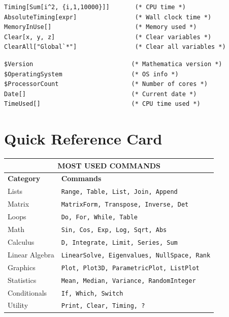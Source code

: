 \documentclass[12pt,a4paper]{article}
\begin{document}
\begin{commandbox}
\begin{lstlisting}
Timing[Sum[i^2, {i,1,10000}]]       (* CPU time *)
AbsoluteTiming[expr]                (* Wall clock time *)
MemoryInUse[]                       (* Memory used *)
Clear[x, y, z]                      (* Clear variables *)
ClearAll["Global`*"]                (* Clear all variables *)
\end{lstlisting}
\end{commandbox}

\begin{commandbox}
\begin{lstlisting}
$Version                           (* Mathematica version *)
$OperatingSystem                   (* OS info *)
$ProcessorCount                    (* Number of cores *)
Date[]                             (* Current date *)
TimeUsed[]                         (* CPU time used *)
\end{lstlisting}
\end{commandbox}

\section{Quick Reference Card}

\begin{center}
\begin{tabular}{|l|l|}
\hline
\multicolumn{2}{|c|}{\textbf{\color{primary} MOST USED COMMANDS}} \\
\hline
\textbf{Category} & \textbf{Commands} \\
\hline
Lists & \texttt{Range, Table, List, Join, Append} \\
Matrix & \texttt{MatrixForm, Transpose, Inverse, Det} \\
Loops & \texttt{Do, For, While, Table} \\
Math & \texttt{Sin, Cos, Exp, Log, Sqrt, Abs} \\
Calculus & \texttt{D, Integrate, Limit, Series, Sum} \\
Linear Algebra & \texttt{LinearSolve, Eigenvalues, NullSpace, Rank} \\
Graphics & \texttt{Plot, Plot3D, ParametricPlot, ListPlot} \\
Statistics & \texttt{Mean, Median, Variance, RandomInteger} \\
Conditionals & \texttt{If, Which, Switch} \\
Utility & \texttt{Print, Clear, Timing, ?} \\
\hline
\end{tabular}
\end{center}
\end{document}
